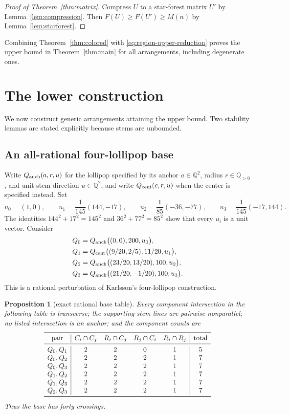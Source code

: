 \documentclass[11pt]{article}
\theoremstyle{plain}
\newtheorem{proposition}[theorem]{Proposition}
\theoremstyle{definition}
\theoremstyle{remark}
\newcommand{\Q}{\mathbb Q}
\newcommand{\1}{\mathbf 1}
\begin{document}
\begin{proof}[Proof of Theorem~\ref{thm:matrix}]
Compress $U$ to a star-forest matrix $U'$ by Lemma~\ref{lem:compression}.
Then $F(U)\geq F(U')\geq M(n)$ by Lemma~\ref{lem:starforest}.
\end{proof}

Combining Theorem~\ref{thm:colored} with
\eqref{eq:region-upper-reduction} proves the upper bound in
Theorem~\ref{thm:main} for all arrangements, including degenerate ones.

\section{The lower construction}\label{sec:lower}

We now construct generic arrangements attaining the upper bound.  Two
stability lemmas are stated explicitly because stems are unbounded.

\subsection{An all-rational four-lollipop base}

Write $Q_{\rm anch}(a,r,u)$ for the lollipop specified by its anchor
$a\in\Q^2$, radius $r\in\Q_{>0}$, and unit stem direction $u\in\Q^2$, and
write $Q_{\rm cent}(c,r,u)$ when the center is specified instead.  Set
\[
 u_0=(1,0),\qquad
 u_1=\frac1{145}(144,-17),\qquad
 u_2=\frac1{85}(-36,-77),\qquad
 u_3=\frac1{145}(-17,144).
\]
The identities $144^2+17^2=145^2$ and $36^2+77^2=85^2$ show that every
$u_i$ is a unit vector.  Consider
\begin{align*}
 Q_0&=Q_{\rm anch}\bigl((0,0),200,u_0\bigr),\\
 Q_1&=Q_{\rm cent}\bigl((9/20,2/5),11/20,u_1\bigr),\\
 Q_2&=Q_{\rm anch}\bigl((23/20,13/20),100,u_2\bigr),\\
 Q_3&=Q_{\rm anch}\bigl((21/20,-1/20),100,u_3\bigr).
\end{align*}
This is a rational perturbation of Karlsson's four-lollipop construction.

\begin{proposition}[exact rational base table]\label{prop:base}
Every component intersection in the following table is transverse; the
supporting stem lines are pairwise nonparallel; no listed intersection is an
anchor; and the component counts are
\[
\begin{array}{c|cccc|c}
\toprule
\text{pair}&C_i\cap C_j&R_i\cap C_j&R_j\cap C_i&R_i\cap R_j&\text{total}\\
\midrule
Q_0,Q_1&2&2&0&1&5\\
Q_0,Q_2&2&2&2&1&7\\
Q_0,Q_3&2&2&2&1&7\\
Q_1,Q_2&2&2&2&1&7\\
Q_1,Q_3&2&2&2&1&7\\
Q_2,Q_3&2&2&2&1&7\\
\bottomrule
\end{array}
\]
Thus the base has forty crossings.
\end{proposition}
\end{document}
